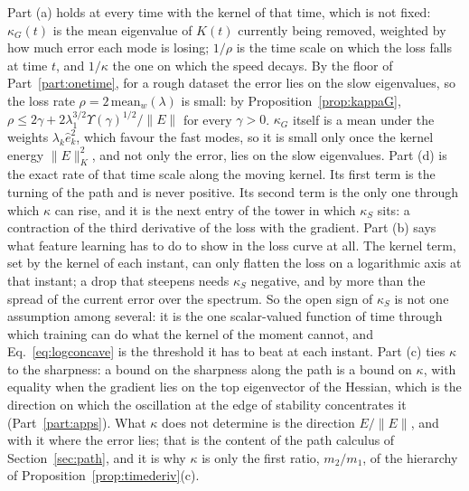 \documentclass[11pt]{article}
\theoremstyle{definition}
\theoremstyle{remark}
\begin{document}
Part (a) holds at every time with the kernel of that time, which is not fixed: $\kappa_G(t)$ is the mean eigenvalue of $K(t)$ currently being removed, weighted by how much error each mode is losing; $1/\rho$ is the time scale on which the loss falls at time $t$, and $1/\kappa$ the one on which the speed decays.
By the floor of Part~\ref{part:onetime}, for a rough dataset the error lies on the slow eigenvalues, so the loss rate $\rho = 2\,\mathrm{mean}_w(\lambda)$ is small: by Proposition~\ref{prop:kappaG}, $\rho\le2\gamma + 2\lambda_1^{3/2}\Upsilon(\gamma)^{1/2}/\|E\|$ for every $\gamma > 0$.
$\kappa_G$ itself is a mean under the weights $\lambda_k\hat e_k^2$, which favour the fast modes, so it is small only once the kernel energy $\|E\|_K^2$, and not only the error, lies on the slow eigenvalues.
Part (d) is the exact rate of that time scale along the moving kernel.
Its first term is the turning of the path and is never positive.
Its second term is the only one through which $\kappa$ can rise, and it is the next entry of the tower in which $\kappa_S$ sits: a contraction of the third derivative of the loss with the gradient.
Part (b) says what feature learning has to do to show in the loss curve at all.
The kernel term, set by the kernel of each instant, can only flatten the loss on a logarithmic axis at that instant; a drop that steepens needs $\kappa_S$ negative, and by more than the spread of the current error over the spectrum.
So the open sign of $\kappa_S$ is not one assumption among several: it is the one scalar-valued function of time through which training can do what the kernel of the moment cannot, and Eq.~\eqref{eq:logconcave} is the threshold it has to beat at each instant.
Part (c) ties $\kappa$ to the sharpness: a bound on the sharpness along the path is a bound on $\kappa$, with equality when the gradient lies on the top eigenvector of the Hessian, which is the direction on which the oscillation at the edge of stability concentrates it (Part~\ref{part:apps}).
What $\kappa$ does not determine is the direction $E/\|E\|$, and with it where the error lies; that is the content of the path calculus of Section~\ref{sec:path}, and it is why $\kappa$ is only the first ratio, $m_2/m_1$, of the hierarchy of Proposition~\ref{prop:timederiv}(c).
\end{document}
